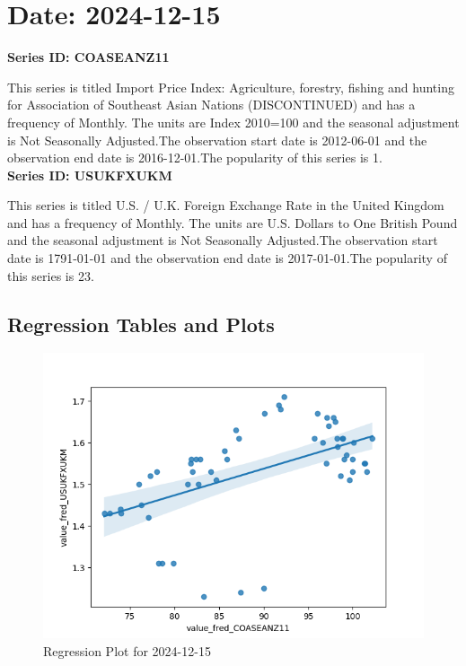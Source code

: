 \section{Date: 2024-12-15}
\noindent \textbf{Series ID: COASEANZ11} 

\noindent This series is titled Import Price Index: Agriculture, forestry, fishing and hunting for Association of Southeast Asian Nations (DISCONTINUED) and has a frequency of Monthly. The units are Index 2010=100 and the seasonal adjustment is Not Seasonally Adjusted.The observation start date is 2012-06-01 and the observation end date is 2016-12-01.The popularity of this series is 1. \\ 

\noindent \textbf{Series ID: USUKFXUKM} 

\noindent This series is titled U.S. / U.K. Foreign Exchange Rate in the United Kingdom and has a frequency of Monthly. The units are U.S. Dollars to One British Pound and the seasonal adjustment is Not Seasonally Adjusted.The observation start date is 1791-01-01 and the observation end date is 2017-01-01.The popularity of this series is 23. \\ 

\subsection{Regression Tables and Plots}


\begin{figure}
\centering
\includegraphics[scale = 0.9]{plots/plot_2024-12-15.png}
\caption{Regression Plot for 2024-12-15}
\end{figure}
\newpage
